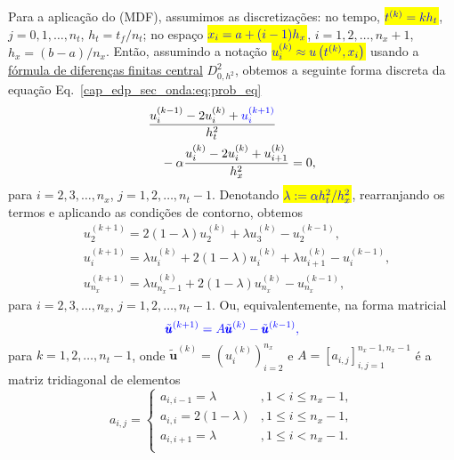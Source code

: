 Para a aplicação do  (MDF), assumimos as discretizações: no tempo, \hl{$\color{blue}t^{(k)} = kh_t$}, $j = 0, 1, \dotsc, n_t$, $h_t = t_f/n_t$; no espaço \hl{$\color{blue}x_i = a + (i-1)h_x$}, $i = 1, 2, \dotsc, n_x+1$, $h_x = (b-a)/n_x$. Então, assumindo a notação \hl{$\color{blue}u^{(k)}_i \approx u\left(t^{(k)},x_i\right)$} usando a \href{https://notaspedrok.com.br/notas/MatematicaNumericaII/cap_deriv_sec_d2f.html}{fórmula de diferenças finitas central} $D^2_{0,h^2}$, obtemos a seguinte forma discreta da equação Eq.~\eqref{cap_edp_sec_onda:eq:prob_eq}
\begin{equation}
  \begin{aligned}
    &\frac{u^{(k-1)}_i - 2u^{(k)}_i + \color{blue}u^{(k+1)}_i}{h_t^2}\\
    &\quad - \alpha \frac{u^{(k)}_i - 2u^{(k)}_i + u^{(k)}_{i+1}}{h_x^2} = 0,
  \end{aligned}
\end{equation}
para $i = 2, 3, \dotsc, n_x$, $j = 1, 2, \dotsc, n_t-1$. Denotando \hl{$\color{blue}\lambda := \alpha h_t^2/h_x^2$}, rearranjando os termos e aplicando as condições de contorno, obtemos 
\begin{subequations}
  \begin{align}
    &u^{(k+1)}_2 =  2\left(1 - \lambda\right)u^{(k)}_2 + \lambda u^{(k)}_3 - u^{(k-1)}_2,\\
    &u^{(k+1)}_i = \lambda u^{(k)}_i + 2(1 - \lambda)u^{(k)}_i + \lambda u^{(k)}_{i+1} - u^{(k-1)}_i,\\
    &u^{(k+1)}_{n_x} = \lambda u^{(k)}_{n_x-1} + 2(1-\lambda)u^{(k)}_{n_x} - u^{(k-1)}_{n_x},
  \end{align}
\end{subequations}
para $i = 2, 3, \dotsc, n_x$, $j = 1, 2, \dotsc, n_t-1$. Ou, equivalentemente, na forma matricial
\begin{equation}\label{cap_edp_sec_onda:eq:iter0}\color{blue}\tilde{\pmb{u}}^{(k+1)} = A\tilde{\pmb{u}}^{(k)} - \tilde{\pmb{u}}^{(k-1)},
\end{equation}
para $k = 1, 2, \dotsc, n_t-1$, onde $\tilde{\pmb{u}}^{(k)} = \left(u^{(k)}_i\right)_{i=2}^{n_x}$ e $A = [a_{i,j}]_{i,j=1}^{n_x-1,n_x-1}$ é a matriz tridiagonal de elementos
\begin{equation}
  a_{i,j} = \left\{
    \begin{array}{ll}
      a_{i,i-1} = \lambda &, 1< i \leq n_x-1,\\
      a_{i,i} = 2(1-\lambda) &, 1\leq i \leq n_x-1,\\
      a_{i,i+1} = \lambda &, 1\leq i < n_x-1.\\
    \end{array}
\right.
\end{equation}

